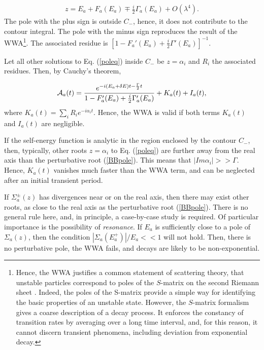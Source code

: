\documentclass[12pt]{article}
\numberwithin{equation}{section}
\begin{document}
\begin{eqnarray}
z = E_a + F_a(E_a) \mp \frac{i}{2} \Gamma_a(E_a) + O(\lambda^4). \label{BBpole}
\end{eqnarray}
The pole with the plus sign is outside $C_-$, hence, it does not contribute to the contour integral. The pole with the minus sign reproduces the result of the WWA\footnote{Hence, the WWA justifies a common statement of scattering theory, that unstable particles correspond to  poles of the $S$-matrix on the second Riemann sheet \cite{colth, RNewt}. Indeed, the poles of the S-matrix provide a simple way for identifying the basic properties of an unstable state. However, the $S$-matrix formalism  gives a coarse description of a decay process. It  enforces the constancy of transition rates \cite{Weinberg} by averaging over a long time interval, and, for this reason, it cannot discern transient phenomena, including deviation from exponential decay.}. The associated residue is $[1 - F_a'(E_a) + \frac{i}{2}\Gamma'(E_a)]^{-1}$.

Let all other solutions to Eq.   (\ref{poleq}) inside $C_-$ be  $z = \alpha_i$ and $R_i$ the associated residues. Then, by Cauchy's theorem,

\begin{eqnarray}
{\cal A}_a(t)  = \frac{e^{ -i (E_a +\delta E ) t - \frac{\Gamma }{2}t}}{1- F_a'(E_a) + \frac{i}{2}\Gamma_a'(E_a)}  + K_a(t) + I_a(t), \label{accuracy}
 \end{eqnarray}
 where
 $K_a(t) = \sum_i R_i e^{-i\alpha_i t}$. Hence, the WWA is valid if both terms $K_a(t)$ and $I_a(t)$ are negligible.

  If the self-energy function is analytic in the region enclosed by the contour $C_-$, then, typically,  other roots $z = \alpha_i$ to Eq. (\ref{poleq}) are further away from the real axis than the perturbative root (\ref{BBpole}). This means that   $|Im \alpha_i| >> \Gamma$. Hence, $K_a(t)$  vanishes much faster than the WWA term, and can be neglected after an initial transient period.

   If
 $\Sigma^{\pm}_a(z)$ has divergences near or on the real axis, then there may exist other roots, as close to the real axis as the perturbative root  (\ref{BBpole}).  There is no general rule here, and, in principle, a case-by-case study is required.
   Of particular importance is the possibility of {\em resonance}. If $E_a$ is sufficiently close to   a pole of $\Sigma_a(z)$, then the condition $|\Sigma_a(E_a^+)|/ E_a <<1$ will not hold. Then, there is no perturbative pole, the WWA fails, and decays are likely to be non-exponential.
\end{document}
